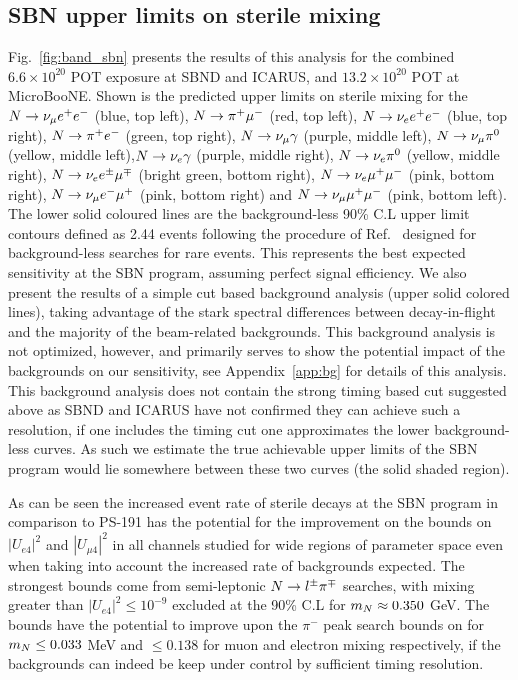 \documentclass[11pt, a4paper]{article}
\newcommand{\reffig}[1]{Fig.~\ref{#1}}
\newcommand{\refapp}[1]{Appendix~\ref{#1}}
\newcommand{\refref}[1]{Ref.~\cite{#1}}
\def\muboone{MicroBooNE}
\def\ster{\ensuremath N}
\begin{document}
\subsection{SBN upper limits on sterile mixing}
%
\reffig{fig:band_sbn} presents the results of this analysis for the combined
$6.6\times 10^{20}$ POT exposure at SBND and ICARUS, and $13.2\times10^{20}$
POT at \muboone. Shown is the predicted upper limits on sterile mixing for the $\ster \rightarrow
\nu_\mu e^+e^-$ (blue, top left), $\ster \rightarrow \pi^+ \mu^-$ (red, top
left), $\ster \rightarrow \nu_e e^+ e^-$ (blue, top right),  $\ster \rightarrow
\pi^+ e^-$ (green, top right), $\ster \rightarrow \nu_\mu \gamma$ (purple,
middle left), $\ster \rightarrow \nu_\mu \pi^0$ (yellow, middle left),$\ster
\rightarrow \nu_e \gamma$ (purple, middle right), $\ster \rightarrow \nu_e
\pi^0$ (yellow, middle right), $\ster \rightarrow \nu_e e^\pm \mu^\mp $ (bright
green, bottom right), $\ster \rightarrow \nu_e \mu^+ \mu^- $ (pink, bottom
right),  $\ster \rightarrow \nu_\mu e^- \mu^+$ (pink, bottom right) and $\ster
\rightarrow \nu_\mu \mu^+ \mu^- $ (pink, bottom left). The lower solid coloured
lines are the background-less 90\% C.L upper limit contours defined as 2.44
events following the procedure of \refref{Feldman:1997qc} designed for
background-less searches for rare events. This represents the best expected
sensitivity at the SBN program, assuming perfect signal efficiency.  We also
present the results of a simple cut based background analysis (upper solid
colored lines), taking advantage of the stark spectral differences between
decay-in-flight and the majority of the beam-related backgrounds. This
background analysis is not optimized, however, and primarily serves to show the
potential impact of the backgrounds on our sensitivity,  see \refapp{app:bg}
for details of this analysis. This background analysis does not contain the
strong timing based cut suggested above as SBND and ICARUS have not confirmed
they can achieve such a resolution, if one includes the timing cut one
approximates the lower background-less curves. As such we estimate the true
achievable upper limits of the SBN program would lie somewhere between these two
curves (the solid shaded region). 

As can be seen the increased event rate of sterile decays at the SBN program in comparison to
PS-191 has the potential for the improvement on the bounds on $|U_{e4}|^2$ and
$|U_{\mu 4}|^2$ in all channels studied for wide regions of parameter space
even when taking into account the increased rate of backgrounds expected. The strongest bounds come from semi-leptonic $\ster \rightarrow l^\pm \pi^\mp$ searches, with mixing greater than $|U_{e4}|^2 \leq 10^{-9}$ excluded at the 90\% C.L for $m_\ster \approx 0.350$ GeV. The bounds have the potential to improve upon the $\pi^-$ peak search bounds on for $m_\ster \leq 0.033$ MeV and $\leq 0.138$ for muon and electron mixing respectively, if the backgrounds can indeed be keep under control by sufficient timing resolution. 
\end{document}
